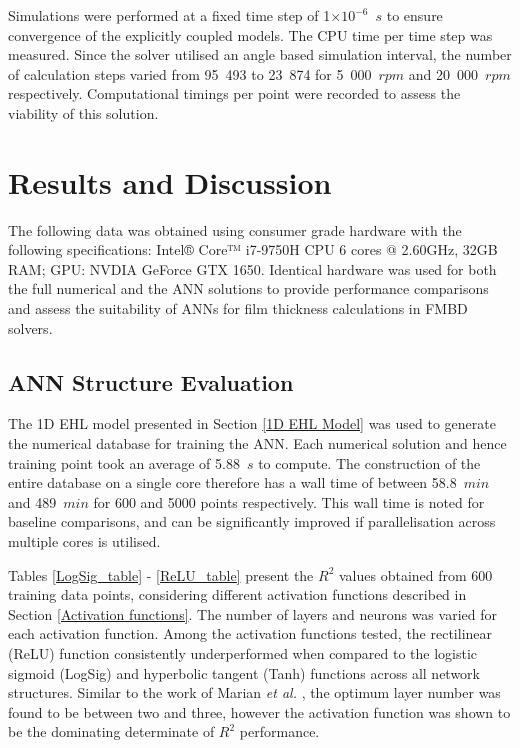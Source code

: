 Simulations were performed at a fixed time step of 1$\times 10^{-6}$~$s$ to ensure convergence of the explicitly coupled models. The CPU time per time step was measured. Since the solver utilised an angle based simulation interval, the number of calculation steps varied from 95~493 to 23~874 for 5~000~$rpm$ and 20~000~$rpm$ respectively. Computational timings per point were recorded to assess the viability of this solution.

\section{Results and Discussion}

The following data was obtained using consumer grade hardware with the following specifications: 
Intel® Core™ i7-9750H CPU 6 cores @ 2.60GHz, 32GB RAM; GPU: NVDIA GeForce GTX 1650. Identical hardware was used for both the full numerical and the ANN solutions to provide performance comparisons and assess the suitability of ANNs for film thickness calculations in FMBD solvers.

\subsection{ANN Structure Evaluation} \label{ANN Structure Evaluation Results}

The 1D EHL model presented in Section \ref{1D EHL Model} was used to generate the numerical database for training the ANN. Each numerical solution and hence training point took an average of 5.88~$s$ to compute. The construction of the entire database on a single core therefore has a wall time of between 58.8~$min$ and 489~$min$ for 600 and 5000 points respectively. This wall time is noted for baseline comparisons, and can be significantly improved if parallelisation across multiple cores is utilised.

Tables \ref{LogSig_table} - \ref{ReLU_table} present the $R^2$ values obtained from 600 training data points, considering different activation functions described in Section \ref{Activation functions}. The number of layers and neurons was varied for each activation function. Among the activation functions tested, the rectilinear (ReLU) function consistently underperformed when compared to the logistic sigmoid (LogSig) and hyperbolic tangent (Tanh) functions across all network structures.  Similar to the work of Marian \textit{et al.} \cite{Marian2021}, the optimum layer number was found to be between two and three, however the activation function was shown to be the dominating determinate of $R^2$ performance.

